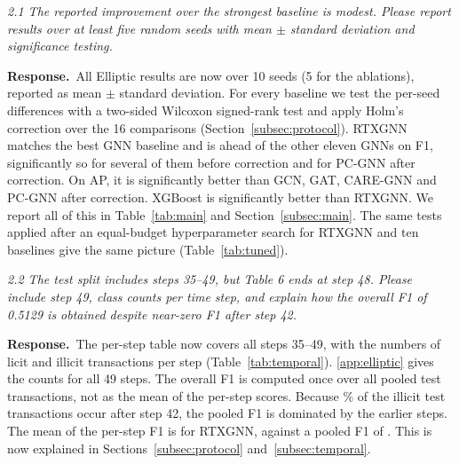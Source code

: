 \documentclass[11pt]{article}
\newenvironment{comment}{\par\medskip\noindent\begin{minipage}{\linewidth}\itshape\color{black!75}}{\end{minipage}\par\smallskip}
\newcommand{\resp}{\par\noindent\textbf{Response.}\ }
\begin{document}
\begin{comment}
2.1 The reported improvement over the strongest baseline is modest. Please report results over at least five random seeds with mean $\pm$ standard deviation and significance testing.
\end{comment}
\resp All Elliptic results are now over 10 seeds (5 for the ablations), reported as mean $\pm$ standard deviation. For every baseline we test the per-seed differences with a two-sided Wilcoxon signed-rank test and apply Holm's correction over the 16 comparisons (Section~\ref{subsec:protocol}). RTXGNN matches the best GNN baseline and is ahead of the other eleven GNNs on F1, significantly so for several of them before correction and for PC-GNN after correction. On AP, it is significantly better than GCN, GAT, CARE-GNN and PC-GNN after correction. XGBoost is significantly better than RTXGNN. We report all of this in Table~\ref{tab:main} and Section~\ref{subsec:main}. The same tests applied after an equal-budget hyperparameter search for RTXGNN and ten baselines give the same picture (Table~\ref{tab:tuned}).

\begin{comment}
2.2 The test split includes steps 35--49, but Table 6 ends at step 48. Please include step 49, class counts per time step, and explain how the overall F1 of 0.5129 is obtained despite near-zero F1 after step 42.
\end{comment}
\resp The per-step table now covers all steps 35--49, with the numbers of licit and illicit transactions per step (Table~\ref{tab:temporal}). \ref{app:elliptic} gives the counts for all 49 steps. The overall F1 is computed once over all pooled test transactions, not as the mean of the per-step scores. Because \illLatePct\% of the illicit test transactions occur after step 42, the pooled F1 is dominated by the earlier steps. The mean of the per-step F1 is \rtxMeanStepFone{} for RTXGNN, against a pooled F1 of \rtxFone{}. This is now explained in Sections~\ref{subsec:protocol} and~\ref{subsec:temporal}.
\end{document}
